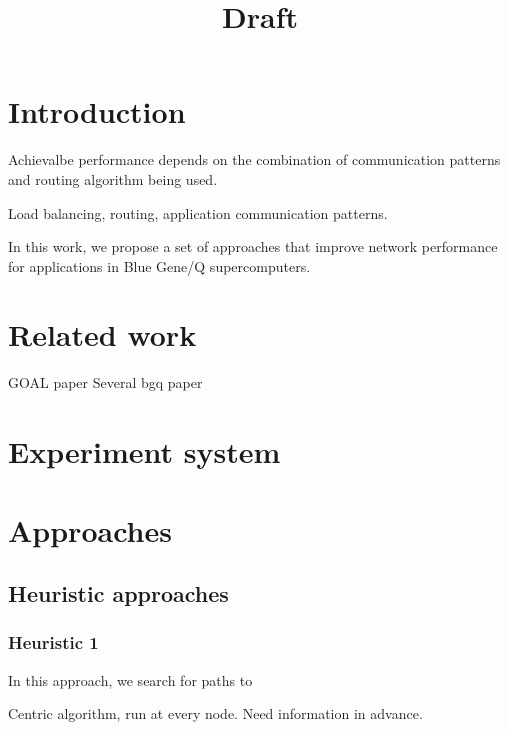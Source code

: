 \documentclass[letter]{article}
\title{Draft}
\begin{document}
\maketitle

\section{Introduction}
Achievalbe performance depends on the combination of communication patterns and routing algorithm being used.

Load balancing, routing, application communication patterns.

In this work, we propose a set of approaches that improve network performance for applications in Blue Gene/Q supercomputers. 

\section{Related work}
GOAL paper
Several bgq paper

\section{Experiment system}

\section{Approaches}

\subsection{Heuristic approaches}

\subsubsection{Heuristic 1}
In this approach, we search for paths to 

Centric algorithm, run at every node. Need information in advance.



\end{document}
